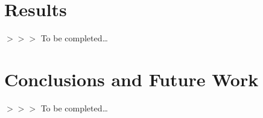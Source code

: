 \documentclass[a4paper, 10pt]{article}
\newcommand{\edcom}[1]{{\sf\color{red}$>>>$ #1}}
\newcommand{\tbc}{\edcom{To be completed\ldots}}
\begin{document}
	\section{Results}\label{sec:results}
	\tbc
	\section{Conclusions and Future Work}\label{sec:conclusions-and-future-work}
	\tbc
\end{document}
